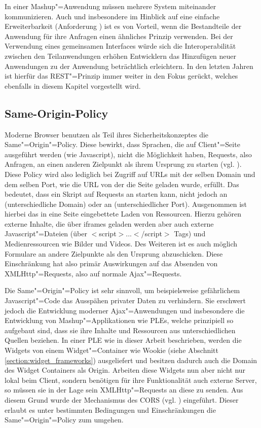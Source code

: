 In einer Mashup"=Anwendung müssen mehrere System miteinander kommunizieren. Auch und insbesondere im Hinblick auf eine einfache Erweiterbarkeit (Anforderung ) ist es von Vorteil, wenn die Bestandteile der Anwendung für ihre Anfragen einen ähnliches Prinzip verwenden. Bei der Verwendung eines gemeinsamen Interfaces würde sich die Interoperabilität zwischen den Teilanwendungen erhöhen Entwicklern das Hinzufügen neuer Anwendungen zu der Anwendung beträchtlich erleichtern. In den letzten Jahren ist hierfür das REST"=Prinzip immer weiter in den Fokus gerückt, welches ebenfalls in diesem Kapitel vorgestellt wird.

\subsection{Same-Origin-Policy}\label{section:same_origin_policy}
Moderne Browser benutzen als Teil ihres Sicherheitskonzeptes die Same"=Origin"=Policy. Diese bewirkt, dass Sprachen, die auf Client"=Seite ausgeführt werden (wie Javascript), nicht die Möglichkeit haben, Requests, also Anfragen, an einen anderen Zielpunkt als ihrem Ursprung zu starten (vgl. \cite{Ruderman2008}). Diese Policy wird also lediglich bei Zugriff auf \acp{URL} mit der selben Domain und dem selben Port, wie die \ac{URL} von der die Seite geladen wurde, erfüllt. Das bedeutet, dass ein Skript auf  Requests an  starten kann, nicht jedoch an  (unterschiedliche Domain) oder an  (unterschiedlicher Port). Ausgenommen ist hierbei das in eine Seite eingebettete Laden von Ressourcen. Hierzu gehören externe Inhalte, die über iframes geladen werden aber auch externe Javascript"=Dateien (über $<$script$>$...$<$/script$>$ Tags) und Medienressourcen wie Bilder und Videos. Des Weiteren ist es auch möglich Formulare an andere Zielpunkte als den Ursprung abzuschicken. Diese Einschränkung hat also primär Auswirkungen auf das Absenden von XMLHttp"=Requests, also auf normale Ajax"=Requests.

Die Same"=Origin"=Policy ist sehr sinnvoll, um beispielsweise gefährlichem Javascript"=Code das Ausspähen privater Daten zu verhindern. Sie erschwert jedoch die Entwicklung moderner Ajax"=Anwendungen und insbesondere die Entwicklung von Mashup"=Applikationen wie \acp{PLE}, welche prinzipiell so aufgebaut sind, dass sie ihre Inhalte und Ressourcen aus unterschiedlichen Quellen beziehen. In einer \ac{PLE} wie in dieser Arbeit beschrieben, werden die Widgets von einem Widget"=Container wie Wookie (siehe Abschnitt \ref{section:widget_frameworks}) ausgeliefert und besitzen dadurch auch die Domain des Widget Containers als Origin. Arbeiten diese Widgets nun aber nicht nur lokal beim Client, sondern benötigen für ihre Funktionalität auch externe Server, so müssen sie in der Lage sein XMLHttp"=Requests an diese zu senden. Aus diesem Grund wurde der Mechanismus des \ac{CORS} (vgl. \cite{vanKesteren2012}) eingeführt. Dieser erlaubt es unter bestimmten Bedingungen und Einschränkungen die Same"=Origin"=Policy zum umgehen.


